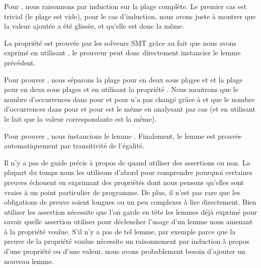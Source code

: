 Pour , nous raisonnons par induction sur la
plage complète. Le premier cas est trivial (le plage est vide), pour le cas
d'induction, nous avons juste à montrer que la valeur ajoutée a été glissée, et
qu'elle est donc la même.


La propriété  est prouvée par les solveurs
SMT grâce au fait que nous avons exprimé  en utilisant
, le prouveur peut donc directement instancier le lemme
précédent.


Pour prouver , nous séparons la plage
pour  en deux sous plages  et
 et la plage pour  en deux sous plages
 et  en utilisant la propriété
. Nous montrons que le nombre d'occurrences
dans  pour  et 
pour  n'a pas changé grâce à 
et que le nombre d'occurrences dans  pour
 et  pour  est le même
en analysant par cas (et en utilisant le fait que la valeur correspondante est
la même).


Pour prouver , nous instancions le lemme
. Finalement, le lemme
 est prouvée automatiquement par transitivité
de l'égalité.




Il n'y a pas de guide précis à propos de quand utiliser des assertions ou non.
La plupart du temps nous les utilisons d'abord pour comprendre pourquoi certaines
preuves échouent en exprimant des propriétés dont nous pensons qu'elles sont vraies
à un point particulier de programme. De plus, il n'est pas rare que les obligations
de preuve soient longues ou un peu complexes à lire directement. Bien utiliser les
assertion nécessite que l'on garde en tête les lemmes déjà exprimé pour savoir
quelle assertion utiliser pour déclencher l'usage d'un lemme nous amenant à la
propriété voulue. S'il n'y a pas de tel lemme, par exemple parce que la preuve
de la propriété voulue nécessite un raisonnement par induction à propos d'une
propriété ou d'une valeur, nous avons probablement besoin d'ajouter un nouveau
lemme.


